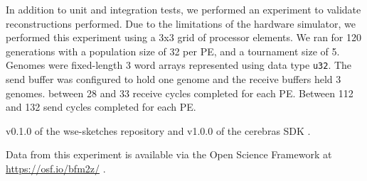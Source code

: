 In addition to unit and integration tests, we performed an experiment to validate reconstructions performed.
Due to the limitations of the hardware simulator, we performed this experiment using a 3x3 grid of processor elements.
We ran for 120 generations with a population size of 32 per PE, and a tournament size of 5.
Genomes were fixed-length 3 word arrays represented using data type \texttt{u32}.
The send buffer was configured to hold one genome and the receive buffers held 3 genomes.
between 28 and 33 receive cycles completed for each PE.
Between 112 and 132 send cycles completed for each PE.

v0.1.0 of the wse-sketches repository \citep{moreno2024wse} and v1.0.0 of the cerebras SDK \citep{selig2022cerebras}.



Data from this experiment is available via the Open Science Framework at \url{https://osf.io/bfm2z/} \citep{moreno2024toward}.
